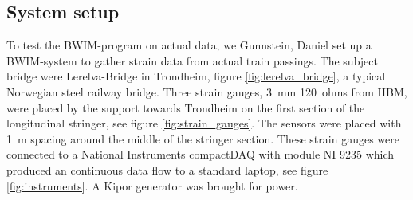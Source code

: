 \subsection{System setup}
\label{system_setup}
To test the BWIM-program on actual data, we Gunnstein, Daniel set up a BWIM-system to gather strain data from actual train passings. The subject bridge were Lerelva-Bridge in Trondheim, figure \ref{fig:lerelva_bridge}, a typical Norwegian steel railway bridge. Three strain gauges, \SI{3}{\mm} \SI{120}{ohms} from HBM, were placed by the support towards Trondheim on the first section of the longitudinal stringer, see figure \ref{fig:strain_gauges}. The sensors were placed with \SI{1}{\m} spacing around the middle of the stringer section. These strain gauges were connected to a National Instruments compactDAQ with module NI 9235 which produced an continuous data flow to a standard laptop, see figure \ref{fig:instruments}. A Kipor generator was brought for power.
